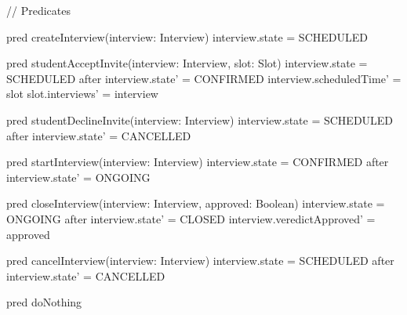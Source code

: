 // Predicates

pred createInterview(interview: Interview) {
    interview.state = SCHEDULED
}

pred studentAcceptInvite(interview: Interview, slot: Slot) {
	interview.state = SCHEDULED
	after {
		interview.state' = CONFIRMED
		interview.scheduledTime' = slot
		slot.interviews' = {interview}
	}	
}

pred studentDeclineInvite(interview: Interview) {
        interview.state = SCHEDULED
        after {interview.state' = CANCELLED}
}

pred startInterview(interview: Interview) {
        interview.state = CONFIRMED
        after {interview.state' = ONGOING}
}

pred closeInterview(interview: Interview, approved: Boolean) {
        interview.state = ONGOING
        after {
		interview.state' = CLOSED
        	interview.veredictApproved' = approved
	}
}

pred cancelInterview(interview: Interview) {
        interview.state = SCHEDULED
        after {interview.state' = CANCELLED}
}

pred doNothing {}
